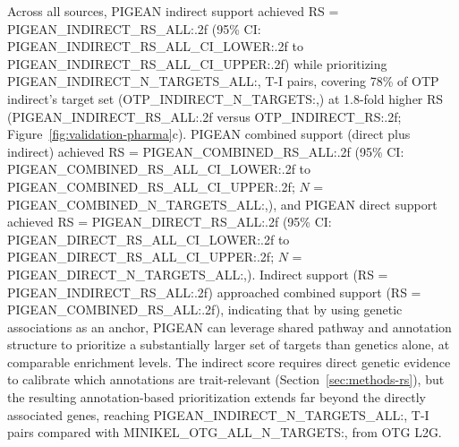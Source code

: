 Across all sources, PIGEAN indirect support achieved RS = {{PIGEAN_INDIRECT_RS_ALL:.2f}} (95\% CI: {{PIGEAN_INDIRECT_RS_ALL_CI_LOWER:.2f}} to {{PIGEAN_INDIRECT_RS_ALL_CI_UPPER:.2f}}) while prioritizing {{PIGEAN_INDIRECT_N_TARGETS_ALL:,}} T-I pairs, covering 78\% of OTP indirect's target set ({{OTP_INDIRECT_N_TARGETS:,}}) at 1.8-fold higher RS ({{PIGEAN_INDIRECT_RS_ALL:.2f}} versus {{OTP_INDIRECT_RS:.2f}}; Figure~\ref{fig:validation-pharma}c). PIGEAN combined support (direct plus indirect) achieved RS = {{PIGEAN_COMBINED_RS_ALL:.2f}} (95\% CI: {{PIGEAN_COMBINED_RS_ALL_CI_LOWER:.2f}} to {{PIGEAN_COMBINED_RS_ALL_CI_UPPER:.2f}}; $N$ = {{PIGEAN_COMBINED_N_TARGETS_ALL:,}}), and PIGEAN direct support achieved RS = {{PIGEAN_DIRECT_RS_ALL:.2f}} (95\% CI: {{PIGEAN_DIRECT_RS_ALL_CI_LOWER:.2f}} to {{PIGEAN_DIRECT_RS_ALL_CI_UPPER:.2f}}; $N$ = {{PIGEAN_DIRECT_N_TARGETS_ALL:,}}). Indirect support (RS = {{PIGEAN_INDIRECT_RS_ALL:.2f}}) approached combined support (RS = {{PIGEAN_COMBINED_RS_ALL:.2f}}), indicating that by using genetic associations as an anchor, PIGEAN can leverage shared pathway and annotation structure to prioritize a substantially larger set of targets than genetics alone, at comparable enrichment levels. The indirect score requires direct genetic evidence to calibrate which annotations are trait-relevant (Section~\ref{sec:methods-rs}), but the resulting annotation-based prioritization extends far beyond the directly associated genes, reaching {{PIGEAN_INDIRECT_N_TARGETS_ALL:,}} T-I pairs compared with {{MINIKEL_OTG_ALL_N_TARGETS:,}} from OTG L2G.

